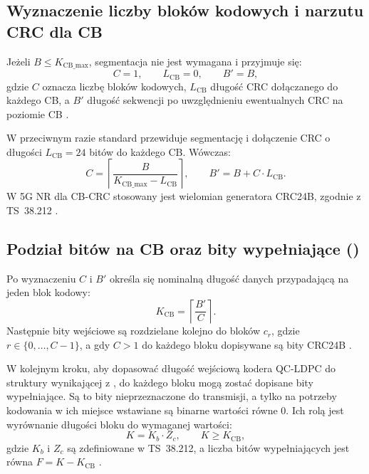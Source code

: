 \subsection{Wyznaczenie liczby bloków kodowych i narzutu CRC dla CB}
Jeżeli $B \le K_{\mathrm{CB\_max}}$, segmentacja nie jest wymagana i przyjmuje się:
\begin{equation}
C = 1,\qquad L_{\mathrm{CB}} = 0,\qquad B' = B,
\label{eq:seg_case_no}
\end{equation}
gdzie $C$ oznacza liczbę bloków kodowych, $L_{\mathrm{CB}}$ długość CRC dołączanego do każdego CB, a $B'$ długość sekwencji po uwzględnieniu ewentualnych CRC na poziomie CB \cite{bib:3gpp_38212}.

W przeciwnym razie standard przewiduje segmentację i dołączenie CRC o długości $L_{\mathrm{CB}} = 24$ bitów do każdego CB. Wówczas:
\begin{equation}
C = \left\lceil \frac{B}{K_{\mathrm{CB\_max}} - L_{\mathrm{CB}}} \right\rceil,\qquad
B' = B + C \cdot L_{\mathrm{CB}}.
\label{eq:seg_case_yes}
\end{equation}
W 5G NR dla CB-CRC stosowany jest wielomian generatora CRC24B, zgodnie z TS~38.212 \cite{bib:3gpp_38212}.

\subsection{Podział bitów na CB oraz bity wypełniające ()}
Po wyznaczeniu $C$ i $B'$ określa się nominalną długość danych przypadającą na jeden blok kodowy:
\begin{equation}
K_{\mathrm{CB}} = \left\lceil\frac{B'}{C}\right\rceil.
\label{eq:seg_kprime}
\end{equation}
Następnie bity wejściowe są rozdzielane kolejno do bloków $c_r$, gdzie $r \in \{0,\dots,C-1\}$, a gdy $C>1$ do każdego bloku dopisywane są bity CRC24B \cite{bib:3gpp_38212}.

W kolejnym kroku, aby dopasować długość wejściową kodera QC-LDPC do struktury wynikającej z , do każdego bloku mogą zostać dopisane bity wypełniające. Są to bity nieprzeznaczone do transmisji, a tylko na potrzeby kodowania w ich miejsce wstawiane są binarne wartości równe 0. Ich rolą jest wyrównanie długości bloku do wymaganej wartości:
\begin{equation}
K = K_b \cdot Z_c,\qquad K \ge K_{\mathrm{CB}},
\label{eq:seg_k_lift}
\end{equation}
gdzie $K_b$ i $Z_c$ są zdefiniowane w TS~38.212, a liczba bitów wypełniających jest równa $F = K - K_{\mathrm{CB}}$ \cite{bib:3gpp_38212}.

